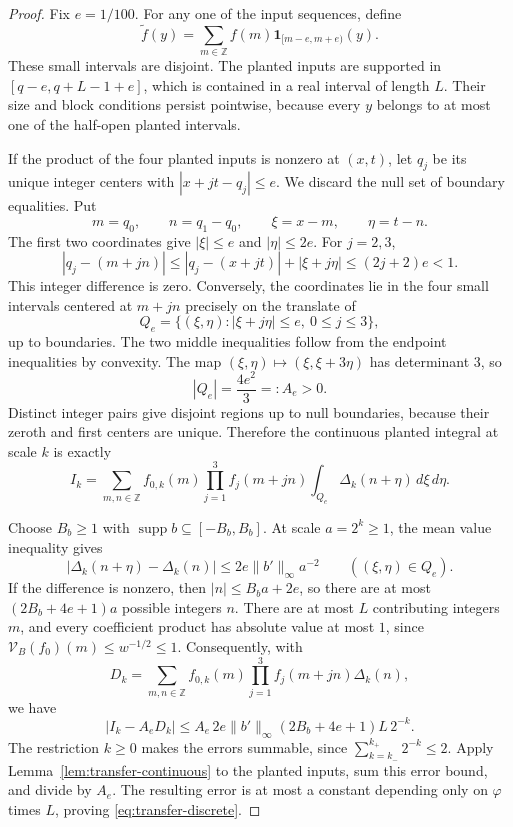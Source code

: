 \begin{proof}
Fix \(e=1/100\).  For any one of the input sequences, define
\[
 \widetilde f(y)=\sum_{m\in\mathbb Z}
       f(m)\mathbf 1_{[m-e,m+e)}(y).
\]
These small intervals are disjoint.  The planted inputs are supported
in \([q-e,q+L-1+e]\), which is contained in a real interval of length
\(L\).  Their size and block conditions persist pointwise, because
every \(y\) belongs to at most one of the half-open planted intervals.

If the product of the four planted inputs is nonzero at \((x,t)\),
let \(q_j\) be its unique integer centers with \(|x+jt-q_j|\leq e\).
We discard the null set of boundary equalities.  Put
\[
 m=q_0,\qquad n=q_1-q_0,\qquad \xi=x-m,\qquad\eta=t-n.
\]
The first two coordinates give \(|\xi|\leq e\) and \(|\eta|\leq2e\).
For \(j=2,3\),
\[
 |q_j-(m+jn)|
 \leq |q_j-(x+jt)|+|\xi+j\eta|
 \leq(2j+2)e<1.
\]
This integer difference is zero.  Conversely, the coordinates lie in
the four small intervals centered at \(m+jn\) precisely on the
translate of
\[
 Q_e=\{(\xi,\eta):|\xi+j\eta|\leq e,\ 0\leq j\leq3\},
\]
up to boundaries.  The two middle inequalities follow from the endpoint
inequalities by convexity.  The map
\((\xi,\eta)\mapsto(\xi,\xi+3\eta)\) has determinant \(3\), so
\[
 |Q_e|=\frac{4e^2}{3}=:A_e>0.
\]
Distinct integer pairs give disjoint regions up to null boundaries,
because their zeroth and first centers are unique.  Therefore the
continuous planted integral at scale \(k\) is exactly
\[
 I_k=\sum_{m,n\in\mathbb Z}
       f_{0,k}(m)\prod_{j=1}^3f_j(m+jn)
       \int_{Q_e}\Delta_k(n+\eta)\,d\xi\,d\eta.
\]

Choose \(B_b\geq1\) with \(\operatorname{supp}b\subseteq[-B_b,B_b]\).
At scale \(a=2^k\geq1\), the mean value inequality gives
\[
 |\Delta_k(n+\eta)-\Delta_k(n)|
       \leq2e\|b'\|_\infty a^{-2}\qquad((\xi,\eta)\in Q_e).
\]
If the difference is nonzero, then \(|n|\leq B_ba+2e\), so there are at
most \((2B_b+4e+1)a\) possible integers \(n\).  There are at most \(L\)
contributing integers \(m\), and every coefficient product has absolute
value at most \(1\), since
\(\mathcal V_B(f_0)(m)\leq w^{-1/2}\leq1\).  Consequently, with
\[
 D_k=\sum_{m,n\in\mathbb Z}
       f_{0,k}(m)\prod_{j=1}^3f_j(m+jn)\Delta_k(n),
\]
we have
\[
 |I_k-A_eD_k|
 \leq A_e\,2e\|b'\|_\infty(2B_b+4e+1)L\,2^{-k}.
\]
The restriction \(k\geq0\) makes the errors summable, since
\(\sum_{k=k_-}^{k_+}2^{-k}\leq2\).  Apply
Lemma~\ref{lem:transfer-continuous} to the planted inputs, sum this error
bound, and divide by \(A_e\).  The resulting error is at most a constant
depending only on \(\varphi\) times \(L\), proving
\eqref{eq:transfer-discrete}.
\end{proof}


